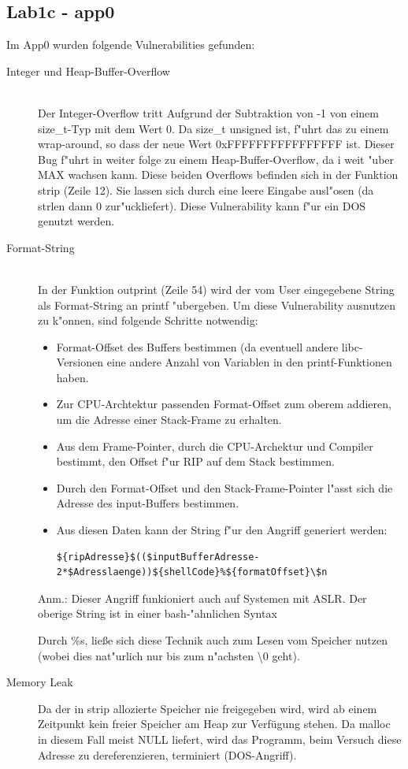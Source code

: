 \documentclass[12pt,a4paper,titlepage,oneside]{scrartcl}
\begin{document}
\subsection{Lab1c - app0}
Im App0 wurden folgende Vulnerabilities gefunden:
\begin{description}
  \item[Integer und Heap-Buffer-Overflow] \hfill \\
    Der Integer-Overflow tritt Aufgrund der Subtraktion von -1 von einem size\_t-Typ mit dem Wert 0. Da size\_t unsigned ist, f"uhrt das zu einem wrap-around, so dass der neue Wert 0xFFFFFFFFFFFFFFFF ist. \newline
    Dieser Bug f"uhrt in weiter folge zu einem Heap-Buffer-Overflow, da i weit "uber MAX wachsen kann.\newline
    Diese beiden Overflows befinden sich in der Funktion strip (Zeile 12). Sie lassen sich durch eine leere Eingabe ausl"osen (da strlen dann 0 zur"uckliefert).
    Diese Vulnerability kann f"ur ein DOS genutzt werden.
    
  \item[Format-String] \hfill \\
  In der Funktion outprint (Zeile 54) wird der vom User eingegebene String als Format-String an printf "ubergeben.
    Um diese Vulnerability ausnutzen zu k"onnen, sind folgende Schritte notwendig:
    \begin{itemize}
        \item Format-Offset des Buffers bestimmen (da eventuell andere libc-Versionen eine andere Anzahl von Variablen in den printf-Funktionen haben.
        \item Zur CPU-Archtektur passenden Format-Offset zum oberem addieren, um die Adresse einer Stack-Frame zu erhalten.
        \item Aus dem Frame-Pointer, durch die CPU-Archektur und Compiler bestimmt, den Offset f"ur RIP auf dem Stack bestimmen.
        \item Durch den Format-Offset und den Stack-Frame-Pointer l"asst sich die Adresse des input-Buffers bestimmen.
        \item Aus diesen Daten kann der String f"ur den Angriff generiert werden:\\
        \begin{lstlisting}
${ripAdresse}$(($inputBufferAdresse-2*$Adresslaenge))${shellCode}%${formatOffset}\$n
        \end{lstlisting}
    \end{itemize}
    Anm.: Dieser Angriff funkioniert auch auf Systemen mit ASLR. Der oberige String ist in einer bash-"ahnlichen Syntax
    
    Durch \%s, ließe sich diese Technik auch zum Lesen vom Speicher nutzen (wobei dies nat"urlich nur bis zum n"achsten \textbackslash0 geht).
    \item[Memory Leak]
    Da der in strip allozierte Speicher nie freigegeben wird, wird ab einem Zeitpunkt kein freier Speicher am Heap zur Verfügung stehen. Da malloc in diesem Fall meist NULL liefert, wird das Programm, beim Versuch diese Adresse zu dereferenzieren, terminiert (DOS-Angriff).
\end{description}
\end{document}
